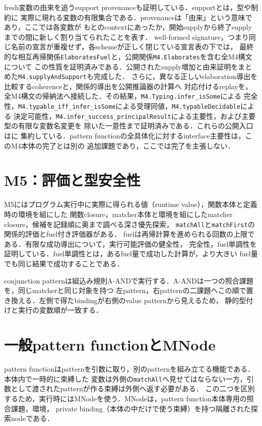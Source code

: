 \documentclass[11pt,a4paper,oneside]{ltjsbook}
\newcommand{\code}[1]{\texttt{#1}}
\begin{document}
fresh変数の由来を追うsupport provenanceも証明している．supportとは，型や制約に
実際に現れる変数の有限集合である．provenanceは「由来」という意味であり，ここでは各変数が
もとのcontextにあったか，開始supplyから終了supplyまでの間に新しく割り当てられたことを表す．
well-formed signature，つまり同じ名前の宣言が重複せず，各schemeが正しく閉じている宣言表の下では，
最終的な相互再帰関係\code{ElaboratesFuel}と，公開関係\code{M4.Elaborates}を含む全M4構文について
この性質を証明済みである．公開されたsupply増加と由来証明をまとめた\code{M4.supplyAndSupport}も完成した．
さらに，異なる正しいelaboration導出を比較するcoherenceと，関係的導出を公開推論器の計算へ
対応付けるreplayを，全M4構文の帰納法へ接続した．その結果，\code{M4.Typing.infer\_isSome}による
完全性，\code{M4.typable\_iff\_infer\_isSome}による受理同値，\code{M4.typableDecidable}による
決定可能性，\code{M4.infer\_success\_principalResult}による主要性，および主要型の有限な変数名変更を
除いた一意性まで証明済みである．これらの公開入口はに
集約している．pattern functionの全具体化に対するinterface主要性は，このM4本体の完了とは別の
追加課題であり，ここでは完了を主張しない．

\section{M5：評価と型安全性}

M5にはプログラム実行中に実際に得られる値（runtime value），関数本体と定義時の環境を組にした
関数closure，matcher本体と環境を組にしたmatcher closure，候補を記録順に奥まで調べる深さ優先探索，
\code{matchAll}と\code{matchFirst}の関係的評価とfuel付き評価器がある．
fuelは再帰計算を進められる回数の上限である．有限な成功導出について，実行可能評価の健全性，
完全性，fuel単調性を証明している．fuel単調性とは，あるfuel量で成功した計算が，より大きい
fuel量でも同じ結果で成功することである．

conjunction patternは組込み規則A-ANDで実行する．A-ANDは一つの照合課題を，同じmatcherと同じ対象を持つ
左pattern，右patternの二課題へこの順で置き換える．左側で得たbindingが右側のvalue patternから見えるため，
静的型付けと実行の変数順が一致する．

\section{一般pattern functionとMNode}

pattern functionはpatternを引数に取り，別のpatternを組み立てる機能である．本体内で一時的に束縛した
変数は外側の\code{matchAll}へ見せてはならない一方，引数として渡されたpatternが作る束縛は外側へ返す必要がある．
この二つを区別するため，実行時にはMNodeを使う．MNodeは，pattern function本体専用の照合課題，環境，
private binding（本体の中だけで使う束縛）を持つ隔離された探索nodeである．
\end{document}
